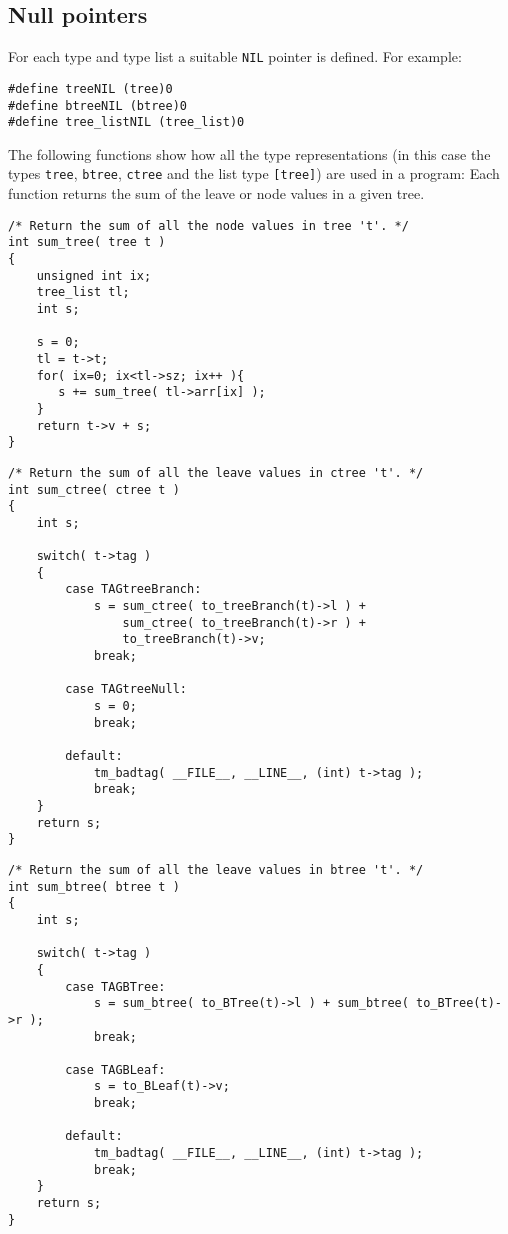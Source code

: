 \subsection{Null pointers}
For each type and type list a suitable \texttt{NIL} pointer is defined.
For example:
\begin{showfile}
\begin{verbatim}
#define treeNIL (tree)0
#define btreeNIL (btree)0
#define tree_listNIL (tree_list)0
\end{verbatim}
\end{showfile}
The following functions show how all the type representations
(in this case the types \texttt{tree}, \texttt{btree}, \texttt{ctree} and the list type
\verb+[tree]+)
are used in a program:
Each function returns the sum of the leave or node values in a given
tree.
\begin{showfile}
\begin{verbatim}
/* Return the sum of all the node values in tree 't'. */
int sum_tree( tree t )
{
    unsigned int ix;
    tree_list tl;
    int s;

    s = 0;
    tl = t->t;
    for( ix=0; ix<tl->sz; ix++ ){
       s += sum_tree( tl->arr[ix] );
    }
    return t->v + s;
}
\end{verbatim}
\end{showfile}

\begin{showfile}
\begin{verbatim}
/* Return the sum of all the leave values in ctree 't'. */
int sum_ctree( ctree t )
{
    int s;

    switch( t->tag )
    {
        case TAGtreeBranch:
            s = sum_ctree( to_treeBranch(t)->l ) +
                sum_ctree( to_treeBranch(t)->r ) +
                to_treeBranch(t)->v;
            break;

        case TAGtreeNull:
            s = 0;
            break;

        default:
            tm_badtag( __FILE__, __LINE__, (int) t->tag );
            break;
    }
    return s;
}
\end{verbatim}
\end{showfile}

\begin{showfile}
\begin{verbatim}
/* Return the sum of all the leave values in btree 't'. */
int sum_btree( btree t )
{
    int s;

    switch( t->tag )
    {
        case TAGBTree:
            s = sum_btree( to_BTree(t)->l ) + sum_btree( to_BTree(t)->r );
            break;

        case TAGBLeaf:
            s = to_BLeaf(t)->v;
            break;

        default:
            tm_badtag( __FILE__, __LINE__, (int) t->tag );
            break;
    }
    return s;
}
\end{verbatim}
\end{showfile}
